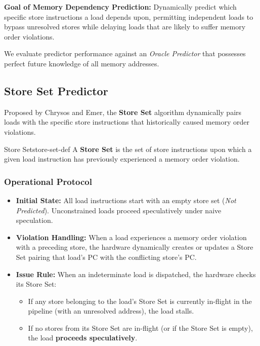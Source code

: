 \textbf{Goal of Memory Dependency Prediction:} Dynamically predict which specific store instructions a load depends upon, permitting independent loads to bypass unresolved stores while delaying loads that are likely to suffer memory order violations.

We evaluate predictor performance against an \textit{Oracle Predictor} that possesses perfect future knowledge of all memory addresses.

\subsection{Store Set Predictor}

Proposed by Chrysos and Emer, the \textbf{Store Set} algorithm dynamically pairs loads with the specific store instructions that historically caused memory order violations.

\begin{definition}{Store Set}{store-set-def}
A \textbf{Store Set} is the set of store instructions upon which a given load instruction has previously experienced a memory order violation.
\end{definition}

\subsubsection{Operational Protocol}
\begin{itemize}
    \item \textbf{Initial State:} All load instructions start with an empty store set (\textit{Not Predicted}). Unconstrained loads proceed speculatively under naive speculation.
    \item \textbf{Violation Handling:} When a load experiences a memory order violation with a preceding store, the hardware dynamically creates or updates a Store Set pairing that load's PC with the conflicting store's PC.
    \item \textbf{Issue Rule:} When an indeterminate load is dispatched, the hardware checks its Store Set:
    \begin{itemize}
        \item If any store belonging to the load's Store Set is currently in-flight in the pipeline (with an unresolved address), the load stalls.
        \item If no stores from its Store Set are in-flight (or if the Store Set is empty), the load \textbf{proceeds speculatively}.
    \end{itemize}
\end{itemize}

